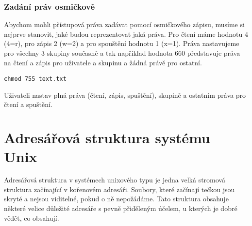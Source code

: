 \documentclass{article}
\begin{document}
\subsubsection{Zadání práv osmičkově}
Abychom mohli přístupová práva zadávat pomocí osmičkového zápisu, musíme si nejprve stanovit, jaké  budou reprezentovat jaká práva. Pro čtení máme hodnotu 4 (4=r), pro zápis 2 (w=2) a pro spouštění hodnotu 1 (x=1). Práva nastavujeme pro všechny 3 skupiny současně a tak například hodnota 660 představuje práva na čtení a zápis pro uživatele a skupinu a žádná právě pro ostatní.

\begin{verbatim}
chmod 755 text.txt
\end{verbatim}
Uživateli nastav plná práva (čtení, zápis, spuštění), skupině a ostatním práva pro čtení a spuštění.

\section{Adresářová struktura systému Unix}
Adresářová struktura v systémech unixového typu je jedna velká stromová struktura začínající v kořenovém adresáři. Soubory, které začínají tečkou jsou skryté a nejsou viditelné, pokud o ně nepožádáme. Tato struktura obsahuje některé velice důležité adresáře s pevně přiděleným účelem, u kterých je dobré vědět, co obsahují.
\end{document}
